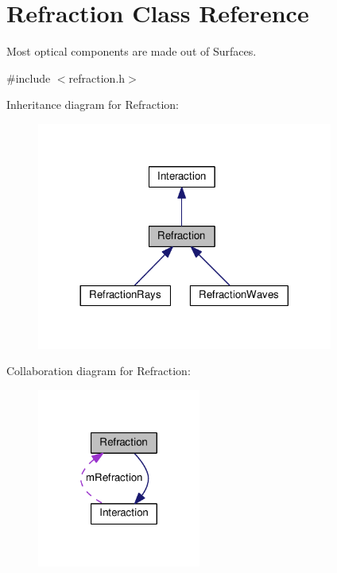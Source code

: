 \hypertarget{classRefraction}{}\section{Refraction Class Reference}
\label{classRefraction}


Most optical components are made out of Surfaces.  




{\ttfamily \#include $<$refraction.\+h$>$}



Inheritance diagram for Refraction\+:\nopagebreak
\begin{figure}[H]
\begin{center}
\leavevmode
\includegraphics[width=276pt]{classRefraction__inherit__graph}
\end{center}
\end{figure}


Collaboration diagram for Refraction\+:\nopagebreak
\begin{figure}[H]
\begin{center}
\leavevmode
\includegraphics[width=152pt]{classRefraction__coll__graph}
\end{center}
\end{figure}
